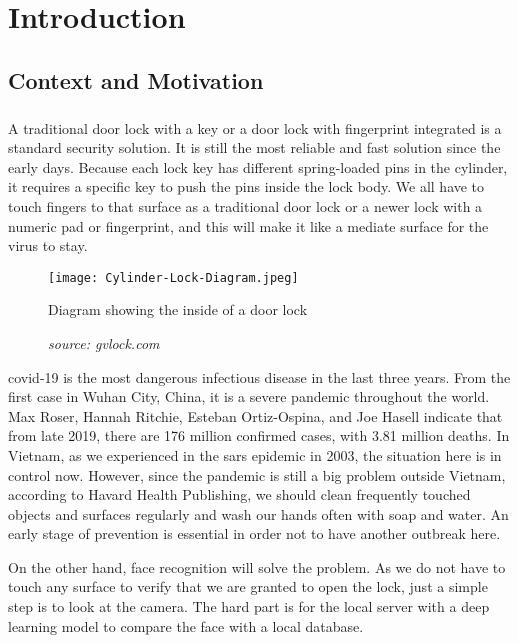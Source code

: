 \chapter{Introduction}

\section{Context and Motivation}
\paragraph{}
A traditional door lock with a key or a door lock with fingerprint integrated is a standard security solution. It is still the most reliable and fast solution since the early days. Because each lock key has different spring-loaded pins in the cylinder, it requires a specific key to push the pins inside the lock body. We all have to touch fingers to that surface as a traditional door lock or a newer lock with a numeric pad or fingerprint, and this will make it like a mediate surface for the virus to stay.

\begin{figure}[H]
    \centering
    \texttt{[image: Cylinder-Lock-Diagram.jpeg]}
    \caption{Diagram showing the inside of a door lock}
    \caption*{\textit{source: gvlock.com}}
    \label{fig:doorLock}
\end{figure}

\acrlong{covid-19} is the most dangerous infectious disease in the last three years. From the first case in Wuhan City, China, it is a severe pandemic throughout the world. Max Roser, Hannah Ritchie, Esteban Ortiz-Ospina, and Joe Hasell\cite{owidcoronavirus} indicate that from late 2019, there are 176 million confirmed cases, with 3.81 million deaths. In Vietnam, as we experienced in the \acrshort{sars} epidemic in 2003, the situation here is in control now. However, since the pandemic is still a big problem outside Vietnam, according to Havard Health Publishing\cite{harvard_health_publishing_2021}, we should clean frequently touched objects and surfaces regularly and wash our hands often with soap and water. An early stage of prevention is essential in order not to have another outbreak here.

On the other hand, face recognition will solve the problem. As we do not have to touch any surface to verify that we are granted to open the lock, just a simple step is to look at the camera. The hard part is for the local server with a deep learning model to compare the face with a local database.

